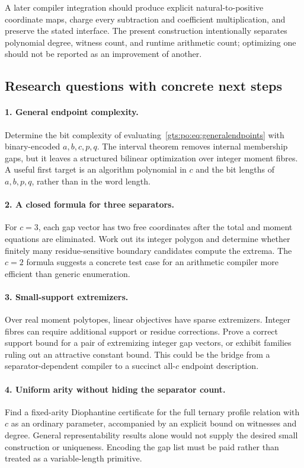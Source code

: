 \documentclass[11pt,letterpaper]{article}
\theoremstyle{definition}
\theoremstyle{remark}
\begin{document}
A later compiler integration should produce explicit natural-to-positive coordinate maps, charge every subtraction and coefficient multiplication, and preserve the stated interface. The present construction intentionally separates polynomial degree, witness count, and runtime arithmetic count; optimizing one should not be reported as an improvement of another.

\subsection{Research questions with concrete next steps}\label{gts:po:sec:questions}
\paragraph{1. General endpoint complexity.}
Determine the bit complexity of evaluating~\eqref{gts:po:eq:generalendpoints} with binary-encoded $a,b,c,p,q$. The interval theorem removes internal membership gaps, but it leaves a structured bilinear optimization over integer moment fibres. A useful first target is an algorithm polynomial in $c$ and the bit lengths of $a,b,p,q$, rather than in the word length.

\paragraph{2. A closed formula for three separators.}
For $c=3$, each gap vector has two free coordinates after the total and moment equations are eliminated. Work out its integer polygon and determine whether finitely many residue-sensitive boundary candidates compute the extrema. The $c=2$ formula suggests a concrete test case for an arithmetic compiler more efficient than generic enumeration.

\paragraph{3. Small-support extremizers.}
Over real moment polytopes, linear objectives have sparse extremizers. Integer fibres can require additional support or residue corrections. Prove a correct support bound for a pair of extremizing integer gap vectors, or exhibit families ruling out an attractive constant bound. This could be the bridge from a separator-dependent compiler to a succinct all-$c$ endpoint description.

\paragraph{4. Uniform arity without hiding the separator count.}
Find a fixed-arity Diophantine certificate for the full ternary profile relation with $c$ as an ordinary parameter, accompanied by an explicit bound on witnesses and degree. General representability results alone would not supply the desired small construction or uniqueness. Encoding the gap list must be paid rather than treated as a variable-length primitive.
\end{document}
